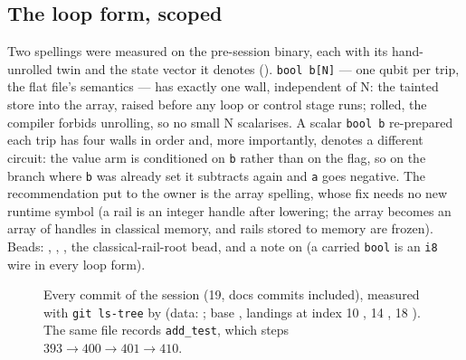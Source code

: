 \subsection*{The loop form, scoped}
Two spellings were measured on the pre-session binary, each with its hand-unrolled twin and the state
vector it denotes (). \texttt{bool b[N]} --- one qubit per trip, the flat
file's semantics --- has exactly one wall, independent of N: the tainted store into the array, raised before
any loop or control stage runs; rolled, the compiler forbids unrolling, so no small N scalarises. A scalar
\texttt{bool b} re-prepared each trip has four walls in order and, more importantly, denotes a different
circuit: the value arm is conditioned on \texttt{b} rather than on the flag, so on the branch where
\texttt{b} was already set it subtracts again and \texttt{a} goes negative. The recommendation put to the
owner is the array spelling, whose fix needs no new runtime symbol (a rail is an integer handle after
lowering; the array becomes an array of handles in classical memory, and rails stored to memory are frozen).
Beads: , , , the classical-rail-root bead, and a note on  (a carried
\texttt{bool} is an \texttt{i8} wire in every loop form).

\begin{figure}[htbp]\centering
{}\hfill
{}
\caption{Every commit of the session (19, docs commits included), measured with \texttt{git ls-tree} by
 (data: ; base
, landings at index 10 , 14 , 18 ). The
same file records \texttt{add\_test}, which steps \(393 \to 400 \to 401 \to 410\).}
\label{fig:005:landings}
\end{figure}

